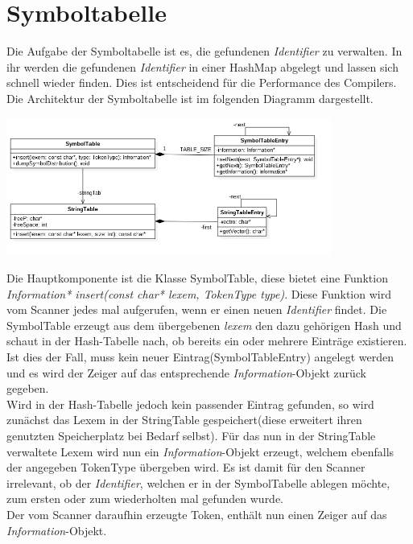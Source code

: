 \documentclass[
    a4paper
]{scrreprt}
\begin{document}
    
    \section{Symboltabelle}
	Die Aufgabe der Symboltabelle ist es, die gefundenen \emph{Identifier} zu verwalten. In ihr werden die gefundenen \emph{Identifier} in einer HashMap abgelegt und lassen sich schnell wieder finden. Dies ist entscheidend für die Performance des Compilers. \\
	Die Architektur der Symboltabelle ist im folgenden Diagramm dargestellt.
	
    \begin{center}
    	\includegraphics[width=0.8\textwidth]{./images/symtable_class.png}
    \end{center}
    
	Die Hauptkomponente ist die Klasse SymbolTable, diese bietet eine Funktion \emph{Information* insert(const char* lexem, TokenType type)}. Diese Funktion wird vom Scanner jedes mal aufgerufen, wenn er einen neuen \emph{Identifier} findet. Die SymbolTable erzeugt aus dem übergebenen \emph{lexem} den dazu gehörigen Hash und schaut in der Hash-Tabelle nach, ob bereits ein oder mehrere Einträge existieren. Ist dies der Fall, muss kein neuer Eintrag(SymbolTableEntry) angelegt werden und es wird der Zeiger auf das entsprechende \emph{Information}-Objekt zurück gegeben.\\
	
	Wird in der Hash-Tabelle jedoch kein passender Eintrag gefunden, so wird zunächst das Lexem in der StringTable gespeichert(diese erweitert ihren genutzten Speicherplatz bei Bedarf selbst). Für das nun in der StringTable verwaltete Lexem wird nun ein \emph{Information}-Objekt erzeugt, welchem ebenfalls der angegeben TokenType übergeben wird. Es ist damit für den Scanner irrelevant, ob der \emph{Identifier}, welchen er in der SymbolTabelle ablegen möchte, zum ersten oder zum wiederholten mal gefunden wurde.\\
	Der vom Scanner daraufhin erzeugte Token, enthält nun einen Zeiger auf das \emph{Information}-Objekt.
    
\end{document}
